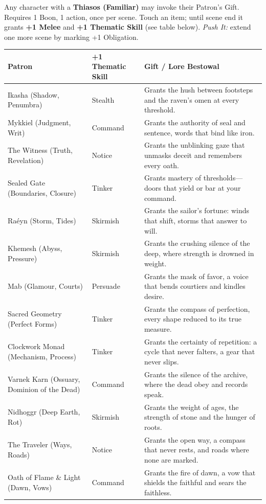 Any character with a \textbf{Thiasos (Familiar)} may invoke their Patron's Gift. Requires 1 Boon, 1 action, once per scene. Touch an item; until scene end it grants \textbf{+1 Melee} and \textbf{+1 Thematic Skill} (see table below). \emph{Push It:} extend one more scene by marking +1 Obligation.

\centering
\renewcommand{\arraystretch}{1.15}
\begin{longtable}{@{}p{3.8cm}p{3.8cm}p{7.5cm}@{}}
\toprule
\textbf{Patron} & \textbf{+1 Thematic Skill} & \textbf{Gift / Lore Bestowal} \\
\midrule
Ikasha (Shadow, Penumbra) & Stealth & Grants the hush between footsteps and the raven's omen at every threshold. \\
Mykkiel (Judgment, Writ) & Command & Grants the authority of seal and sentence, words that bind like iron. \\
The Witness (Truth, Revelation) & Notice & Grants the unblinking gaze that unmasks deceit and remembers every oath. \\
Sealed Gate (Boundaries, Closure) & Tinker & Grants mastery of thresholds---doors that yield or bar at your command. \\
Raéyn (Storm, Tides) & Skirmish & Grants the sailor's fortune: winds that shift, storms that answer to will. \\
Khemesh (Abyss, Pressure) & Skirmish & Grants the crushing silence of the deep, where strength is drowned in weight. \\
Mab (Glamour, Courts) & Persuade & Grants the mask of favor, a voice that bends courtiers and kindles desire. \\
Sacred Geometry (Perfect Forms) & Tinker & Grants the compass of perfection, every shape reduced to its true measure. \\
Clockwork Monad (Mechanism, Process) & Tinker & Grants the certainty of repetition: a cycle that never falters, a gear that never slips. \\
Varnek Karn (Ossuary, Dominion of the Dead) & Command & Grants the silence of the archive, where the dead obey and records speak. \\
Nidhoggr (Deep Earth, Rot) & Skirmish & Grants the weight of ages, the strength of stone and the hunger of roots. \\
The Traveler (Ways, Roads) & Notice & Grants the open way, a compass that never rests, and roads where none are marked. \\
Oath of Flame \& Light (Dawn, Vows) & Command & Grants the fire of dawn, a vow that shields the faithful and sears the faithless. \\

\end{longtable}
